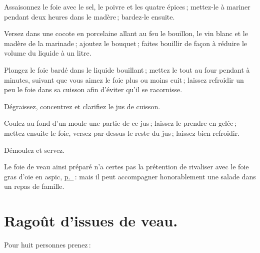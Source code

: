 Assaisonnez le foie avec le sel, le poivre et les quatre épices ; mettez-le
à mariner pendant deux heures dans le madère ; bardez-le ensuite.

Versez dans une cocote en porcelaine allant au feu le bouillon, le vin blanc et
le madère de la marinade ; ajoutez le bouquet ; faites bouillir de façon
à réduire le volume du liquide à un litre.

Plongez le foie bardé dans le liquide bouillant ; mettez le tout au four
pendant {\mmm} à {\mmm} minutes, suivant que vous aimez le foie plus ou moins cuit ;
laissez refroidir un peu le foie dans sa cuisson afin d'éviter qu'il se
racornisse.

Dégraissez, concentrez et clarifiez le jus de cuisson.

Coulez au fond d'un moule une partie de ce jus ; laissez-le prendre en gelée ;
mettez ensuite le foie, versez par-dessus le reste du jus ; laissez bien
refroidir.

Démoulez et servez.

Le foie de veau ainsi préparé n'a certes pas la prétention de rivaliser avec le
foie gras d'oie en aspic, \hyperlink{p0596}{p. \pageref{pg0596}} : mais il peut
accompagner honorablement une salade dans un repas de famille.

\section*{\centering Ragoût d'issues de veau.}
{}

Pour huit personnes prenez :

\medskip

